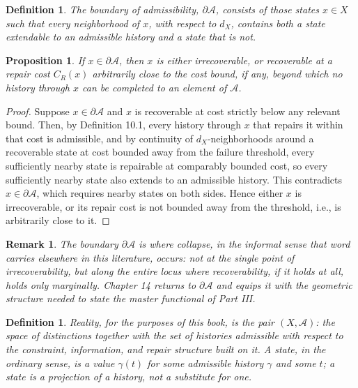\documentclass[11pt]{book}
\newtheorem{definition}[theorem]{Definition}
\newtheorem{proposition}[theorem]{Proposition}
\newtheorem{remark}[theorem]{Remark}
\begin{document}
\begin{definition}
The \emph{boundary} of admissibility, $\partial \mathcal A$, consists of those states $x \in X$ such that every neighborhood of $x$, with respect to $d_X$, contains both a state extendable to an admissible history and a state that is not.
\end{definition}

\begin{proposition}
If $x \in \partial \mathcal A$, then $x$ is either irrecoverable, or recoverable at a repair cost $C_R(x)$ arbitrarily close to the cost bound, if any, beyond which no history through $x$ can be completed to an element of $\mathcal A$.
\end{proposition}

\begin{proof}
Suppose $x \in \partial \mathcal A$ and $x$ is recoverable at cost strictly below any relevant bound. Then, by Definition 10.1, every history through $x$ that repairs it within that cost is admissible, and by continuity of $d_X$-neighborhoods around a recoverable state at cost bounded away from the failure threshold, every sufficiently nearby state is repairable at comparably bounded cost, so every sufficiently nearby state also extends to an admissible history. This contradicts $x \in \partial \mathcal A$, which requires nearby states on both sides. Hence either $x$ is irrecoverable, or its repair cost is not bounded away from the threshold, i.e., is arbitrarily close to it.
\end{proof}

\begin{remark}
The boundary $\partial \mathcal A$ is where collapse, in the informal sense that word carries elsewhere in this literature, occurs: not at the single point of irrecoverability, but along the entire locus where recoverability, if it holds at all, holds only marginally. Chapter 14 returns to $\partial \mathcal A$ and equips it with the geometric structure needed to state the master functional of Part III.
\end{remark}

\begin{definition}
Reality, for the purposes of this book, is the pair $(X, \mathcal A)$: the space of distinctions together with the set of histories admissible with respect to the constraint, information, and repair structure built on it. A \emph{state}, in the ordinary sense, is a value $\gamma(t)$ for some admissible history $\gamma$ and some $t$; a state is a projection of a history, not a substitute for one.
\end{definition}
\end{document}

